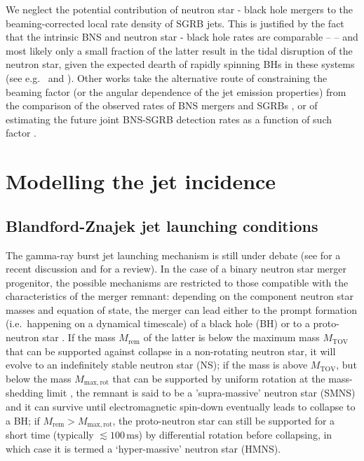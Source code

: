 \documentclass[]{aa}
\newcommand{\resp}[1]{#1}
\begin{document}
\resp{We neglect} the potential contribution of neutron star - black hole mergers \resp{to the beaming-corrected local rate density of SGRB jets.  This is justified by the fact that} the intrinsic BNS and neutron star - black hole rates are comparable -- \citealt{Abbott2021_NSBH} -- and most likely only a small fraction of the latter result in the tidal disruption of the neutron star, \resp{given the expected dearth of rapidly spinning BHs in these systems} (see e.g.~\citealt{Broekgaarden2021_NSBH} and \citealt{Zappa2019}). Other works take the alternative route of constraining the beaming factor (or the angular dependence of the jet emission properties) from the comparison \resp{of the observed rates of BNS mergers and SGRBs} \citep[e.g.][]{Williams2018,Biscoveanu2020,Farah2020,Hayes2020}, or of estimating the future joint BNS-SGRB detection rates as a function of such factor \citep[e.g.][]{Chen2013,Clark2015}. 

 
\section{Modelling the jet incidence}
\label{sec:Modelling_fjet}
\subsection{Blandford-Znajek jet launching conditions}
\label{sec:BZconditions}

The gamma-ray burst jet launching mechanism is still under debate (see \citealt{Salafia2021} for a recent discussion \resp{and \citealt{Kumar2015} for a review}). In the case of a binary neutron star merger progenitor, the possible mechanisms are restricted to those compatible with the characteristics of the merger remnant: depending on the component neutron star masses and equation of state, the merger can lead either to the prompt formation (i.e.~happening on a dynamical timescale) of a black hole (BH) or to a proto-neutron star \citep{Burrows1986}. If the mass $M_\mathrm{rem}$ of the latter is below the maximum mass $M_\mathrm{TOV}$ that can be supported against collapse in a non-rotating neutron star, it will evolve to an indefinitely stable neutron star (NS); if the mass is above $M_\mathrm{TOV}$, but below the mass $M_\mathrm{max,rot}$ that can be supported by uniform rotation at the mass-shedding limit \citep{Goussard1997}, the remnant is said to be a 'supra-massive' neutron star (SMNS) and it can survive until electromagnetic spin-down eventually leads to collapse to a BH; if $M_\mathrm{rem}>M_\mathrm{max,rot}$, the proto-neutron star can still be supported \citep{Goussard1998} for a short time (typically $\lesssim 100\,\mathrm{ms}$) by differential rotation before collapsing, in which case it is termed a `hyper-massive' neutron star (HMNS).
\end{document}
